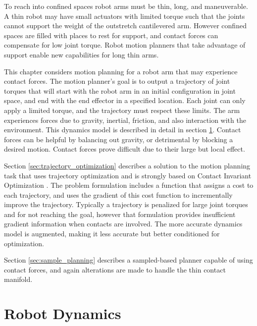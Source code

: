 \documentclass[../thesis.tex]{subfiles}
\begin{document}
To reach into confined spaces robot arms must be thin, long, and maneuverable.
A thin robot may have small actuators with limited torque such that the joints cannot support the weight of the outstretch cantilevered arm.
However confined spaces are filled with places to rest for support, and contact forces can compensate for low joint torque. 
Robot motion planners that take advantage of support enable new capabilities for long thin arms.

This chapter considers motion planning for a robot arm that may experience contact forces.
The motion planner's goal is to output a trajectory of joint torques that will start with the robot arm in an initial configuration in joint space, and end with the end effector in a specified location.
Each joint can only apply a limited torque, and the trajectory must respect these limits.
The arm experiences forces due to gravity, inertial, friction, and also interaction with the environment.
This dynamics model is described in detail in section \ref{sec:robot_dynamics}.
Contact forces can be helpful by balancing out gravity, or detrimental by blocking a desired motion.
Contact forces prove difficult due to their large but local effect.


Section \ref{sec:trajectory_optimization} describes a solution to the motion planning task that uses trajectory optimization and is strongly based on Contact Invariant Optimization \cite{Mordatch2012}.
The problem formulation includes a function that assigns a cost to each trajectory, and uses the gradient of this cost function to incrementally improve the trajectory.
Typically a trajectory is penalized for large joint torques and for not reaching the goal, however that formulation provides insufficient gradient information when contacts are involved.
The more accurate dynamics model is augmented, making it less accurate but better conditioned for optimization.

Section \ref{sec:sample_planning} describes a sampled-based planner capable of using contact forces, and again alterations are made to handle the thin contact manifold.







\section{Robot Dynamics} \label{sec:robot_dynamics}
\end{document}
